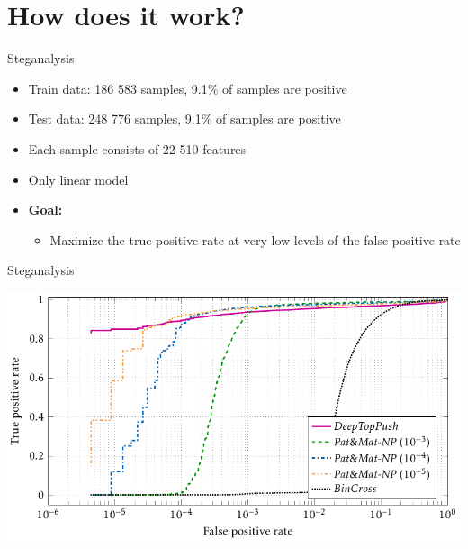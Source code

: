 \documentclass[10pt, aspectratio=169]{beamer}
\begin{document}
\section{How does it work?}

\begin{frame}{Steganalysis}
  \begin{itemize}
    \item Train data: 186 583 samples, 9.1\% of samples are positive
    \item Test data: 248 776 samples, 9.1\% of samples are positive
    \item Each sample consists of 22 510 features
    \item Only linear model
    \item \textbf{Goal:}
    \begin{itemize}
      \item Maximize the true-positive rate at very low levels of the false-positive rate
    \end{itemize}
  \end{itemize}
\end{frame}

\begin{frame}{Steganalysis}
  \begin{center}
    \includegraphics[width=\linewidth, height=0.9\textheight, keepaspectratio]{
      ../images/stego_nsft5.pdf
    }
  \end{center}
\end{frame}
\end{document}
